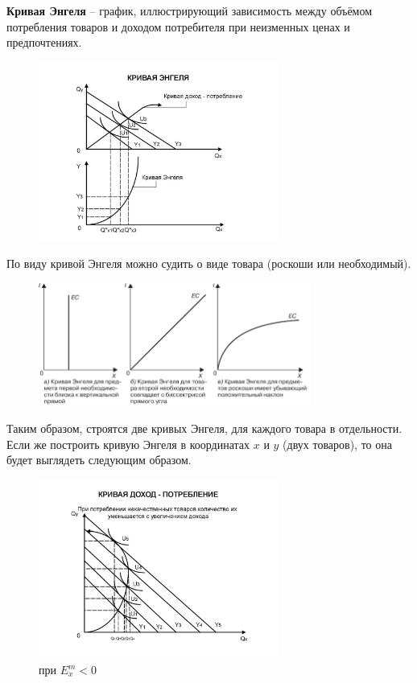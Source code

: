 \documentclass[reqno]{article}
\theoremstyle{definition}
\theoremstyle{definition}
\theoremstyle{definition}
\theoremstyle{definition}
\theoremstyle{definition}
\theoremstyle{definition}
\theoremstyle{definition}
\theoremstyle{definition}
\theoremstyle{definition}
\begin{document}
	\textbf{Кривая Энгеля} -- график, иллюстрирующий зависимость между объёмом потребления товаров и доходом потребителя при неизменных ценах и предпочтениях.
	
	\begin{figure}[h!]
		\centering
		\includegraphics[width=0.7\textwidth]{КриваяЭнгеля}
	\end{figure}
	
	По виду кривой Энгеля можно судить о виде товара (роскоши или необходимый).
	\begin{figure}[h!]
		\centering
		\includegraphics[width=0.8\textwidth]{ВидыКривыхЭнгеля}
	\end{figure}
	
	Таким образом, строятся две кривых Энгеля, для каждого товара в отдельности. Если же  построить кривую Энгеля в координатах $x$ и $y$ (двух товаров), то она будет выглядеть следующим образом.
	
	\begin{figure}[h!]
		\centering
		\includegraphics[width=0.7\textwidth]{КриваяЭнгеля2}
		\caption{при $E_x^m<0$} 
	\end{figure}
	
\end{document}
